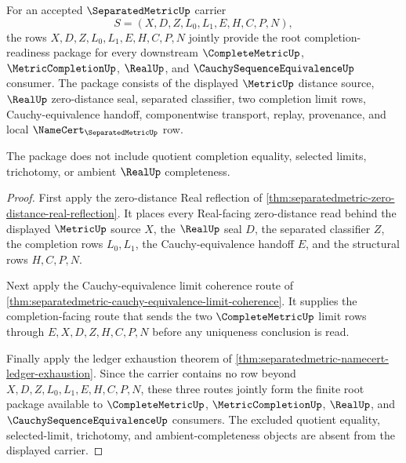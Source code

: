\begin{theorem}
\label{thm:separatedmetric-root-finite-completion-readiness}
For an accepted $\SeparatedMetricUp$ carrier
$$
S=(X,D,Z,L_0,L_1,E,H,C,P,N),
$$
the rows $X,D,Z,L_0,L_1,E,H,C,P,N$ jointly provide the root completion-readiness package for every downstream $\CompleteMetricUp$, $\MetricCompletionUp$, $\RealUp$, and $\CauchySequenceEquivalenceUp$ consumer. The package consists of the displayed $\MetricUp$ distance source, $\RealUp$ zero-distance seal, separated classifier, two completion limit rows, Cauchy-equivalence handoff, componentwise transport, replay, provenance, and local $\NameCert_{\SeparatedMetricUp}$ row.

The package does not include quotient completion equality, selected limits, trichotomy, or ambient $\RealUp$ completeness.
\end{theorem}
\begin{proof}
First apply the zero-distance Real reflection of \autoref{thm:separatedmetric-zero-distance-real-reflection}. It places every Real-facing zero-distance read behind the displayed $\MetricUp$ source $X$, the $\RealUp$ seal $D$, the separated classifier $Z$, the completion rows $L_0,L_1$, the Cauchy-equivalence handoff $E$, and the structural rows $H,C,P,N$.

Next apply the Cauchy-equivalence limit coherence route of \autoref{thm:separatedmetric-cauchy-equivalence-limit-coherence}. It supplies the completion-facing route that sends the two $\CompleteMetricUp$ limit rows through $E,X,D,Z,H,C,P,N$ before any uniqueness conclusion is read.

Finally apply the ledger exhaustion theorem of \autoref{thm:separatedmetric-namecert-ledger-exhaustion}. Since the carrier contains no row beyond $X,D,Z,L_0,L_1,E,H,C,P,N$, these three routes jointly form the finite root package available to $\CompleteMetricUp$, $\MetricCompletionUp$, $\RealUp$, and $\CauchySequenceEquivalenceUp$ consumers. The excluded quotient equality, selected-limit, trichotomy, and ambient-completeness objects are absent from the displayed carrier.
\end{proof}
